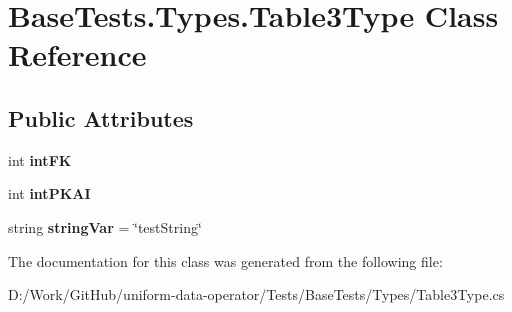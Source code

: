 \hypertarget{class_base_tests_1_1_types_1_1_table3_type}{}\section{Base\+Tests.\+Types.\+Table3\+Type Class Reference}
\label{class_base_tests_1_1_types_1_1_table3_type}
\subsection*{Public Attributes}
\begin{DoxyCompactItemize}
\item 
\mbox{\label{class_base_tests_1_1_types_1_1_table3_type_adbab457a69b0bbbc8bc2807e19a2793d}} 
int {\bfseries int\+FK}
\item 
\mbox{\label{class_base_tests_1_1_types_1_1_table3_type_ab1c6286c3999dc909fcf2dd9b9836da1}} 
int {\bfseries int\+P\+K\+AI}
\item 
\mbox{\label{class_base_tests_1_1_types_1_1_table3_type_abd686cdb0d1bc99ed5281c5a6128d39e}} 
string {\bfseries string\+Var} = \char`\"{}test\+String\char`\"{}
\end{DoxyCompactItemize}


The documentation for this class was generated from the following file\+:\begin{DoxyCompactItemize}
\item 
D\+:/\+Work/\+Git\+Hub/uniform-\/data-\/operator/\+Tests/\+Base\+Tests/\+Types/Table3\+Type.\+cs\end{DoxyCompactItemize}
